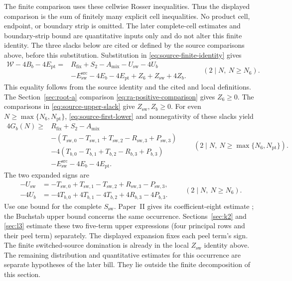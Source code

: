 The finite comparison uses these cellwise Rosser inequalities.
Thus the displayed comparison is the sum of finitely many explicit cell
inequalities. No product cell, endpoint, or boundary strip is
omitted. The later complete-cell estimates and boundary-strip bound are
quantitative inputs only and do not alter this finite identity.
The three slacks below are cited or defined by the source comparisons
above, before this substitution.
Substitution in \eqref{eq:source-finite-identity} gives
\begin{equation}\label{eq:source-exact-slack}
\begin{aligned}
 \mathcal W-4B_b-4E_{\mathrm{pt}}
 ={}&R_{\mathrm{fix}}+S_2-A_{\mathrm{mix}}
       -U_{\mathrm{sw}}-4U_b\\
    &-E_{\mathrm{sw}}^{\mathrm{src}}-4E_b-4E_{\mathrm{pt}}
       +Z_6+Z_{\mathrm{sw}}+4Z_b.
\end{aligned}
\qquad(2\mid N,\ N\ge N_6).
\end{equation}
This equality follows from the source identity and the cited and
local definitions. The Section~\ref{sec:root-a} comparison
\eqref{eq:ra-positive-comparison} gives \(Z_6\ge0\). The comparisons in
\eqref{eq:source-upper-slack} give \(Z_{\mathrm{sw}},Z_b\ge0\).
For even \(N\ge\max\{N_6,N_{\mathrm{pt}}\}\),
\eqref{eq:source-first-lower} and nonnegativity of these slacks yield
\begin{equation}\label{eq:source-final-lower}
\begin{aligned}
 4G_b(N)\ge{}&R_{\mathrm{fix}}+S_2-A_{\mathrm{mix}}\\
 &-(T_{\mathrm{sw},0}-T_{\mathrm{sw},1}+T_{\mathrm{sw},2}
                         -R_{\mathrm{sw},3}+P_{\mathrm{sw},3})\\
 &-4(T_{b,0}-T_{b,1}+T_{b,2}-R_{b,3}+P_{b,3})\\
 &-E_{\mathrm{sw}}^{\mathrm{src}}-4E_b-4E_{\mathrm{pt}}.
\end{aligned}
\qquad(2\mid N,\ N\ge\max\{N_6,N_{\mathrm{pt}}\}).
\end{equation}
The two expanded signs are
\begin{equation}\label{eq:source-expanded-signs}
\begin{aligned}
 -U_{\mathrm{sw}}&=-T_{\mathrm{sw},0}+T_{\mathrm{sw},1}
                  -T_{\mathrm{sw},2}+R_{\mathrm{sw},3}-P_{\mathrm{sw},3},\\
 -4U_b&=-4T_{b,0}+4T_{b,1}-4T_{b,2}+4R_{b,3}-4P_{b,3}.
\end{aligned}
\qquad(2\mid N,\ N\ge N_6).
\end{equation}
Use one bound for the complete \(S_{\mathrm{sw}}\).
Paper~II gives its coefficient-eight estimate
\cite[(1.9), (5.29)--(5.43)]{PaperII}; the Buchstab upper bound
concerns the same occurrence.
Sections~\ref{sec:k2} and \ref{sec:l3} estimate these two five-term
upper expressions (four principal rows and their peel term) separately.
The displayed expansion fixes each peel term's sign.
The finite switched-source domination is already in the
local \(Z_{\mathrm{sw}}\) identity above. The remaining distribution
and quantitative estimates for this occurrence are separate hypotheses
of the later bill. They lie outside the finite decomposition of this section.


